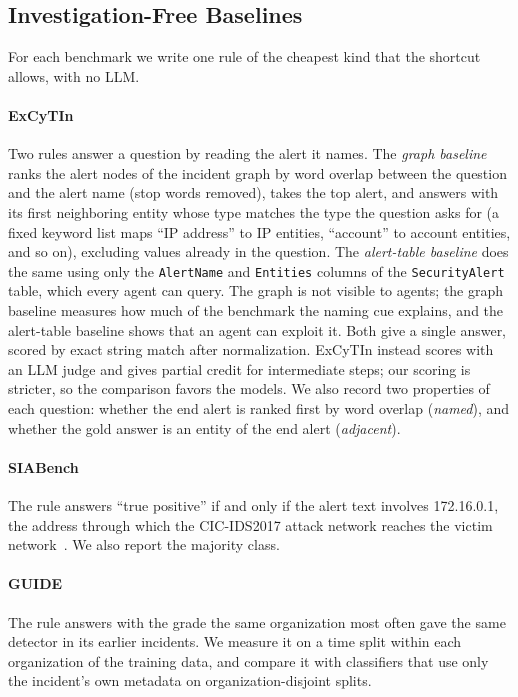 \subsection{Investigation-Free Baselines}
\label{sec:baselines}

For each benchmark we write one rule of the cheapest kind that the shortcut allows, with no LLM.

\paragraph{ExCyTIn} Two rules answer a question by reading the alert it names. The \emph{graph baseline} ranks the alert nodes of the incident graph by word overlap between the question and the alert name (stop words removed), takes the top alert, and answers with its first neighboring entity whose type matches the type the question asks for (a fixed keyword list maps ``IP address'' to IP entities, ``account'' to account entities, and so on), excluding values already in the question. The \emph{alert-table baseline} does the same using only the \texttt{AlertName} and \texttt{Entities} columns of the \texttt{SecurityAlert} table, which every agent can query. The graph is not visible to agents; the graph baseline measures how much of the benchmark the naming cue explains, and the alert-table baseline shows that an agent can exploit it. Both give a single answer, scored by exact string match after normalization. ExCyTIn instead scores with an LLM judge and gives partial credit for intermediate steps; our scoring is stricter, so the comparison favors the models. We also record two properties of each question: whether the end alert is ranked first by word overlap (\emph{named}), and whether the gold answer is an entity of the end alert (\emph{adjacent}).

\paragraph{SIABench} The rule answers ``true positive'' if and only if the alert text involves 172.16.0.1, the address through which the CIC-IDS2017 attack network reaches the victim network~\citep{cicids2017}. We also report the majority class.

\paragraph{GUIDE} The rule answers with the grade the same organization most often gave the same detector in its earlier incidents. We measure it on a time split within each organization of the training data, and compare it with classifiers that use only the incident's own metadata on organization-disjoint splits.

